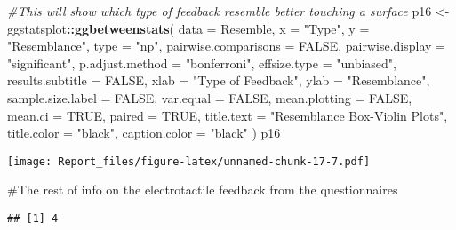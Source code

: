 \documentclass[
]{article}
\newenvironment{Shaded}{\begin{snugshade}}{\end{snugshade}}
\newcommand{\CommentTok}[1]{\textcolor[rgb]{0.56,0.35,0.01}{\textit{#1}}}
\newcommand{\DataTypeTok}[1]{\textcolor[rgb]{0.13,0.29,0.53}{#1}}
\newcommand{\KeywordTok}[1]{\textcolor[rgb]{0.13,0.29,0.53}{\textbf{#1}}}
\newcommand{\NormalTok}[1]{#1}
\newcommand{\OperatorTok}[1]{\textcolor[rgb]{0.81,0.36,0.00}{\textbf{#1}}}
\newcommand{\OtherTok}[1]{\textcolor[rgb]{0.56,0.35,0.01}{#1}}
\newcommand{\StringTok}[1]{\textcolor[rgb]{0.31,0.60,0.02}{#1}}
\begin{document}
\begin{Shaded}
\begin{Highlighting}[]
\CommentTok{#This will show which type of feedback resemble better touching a surface}
\NormalTok{p16 <-}\StringTok{ }\NormalTok{ggstatsplot}\OperatorTok{::}\KeywordTok{ggbetweenstats}\NormalTok{(}
  \DataTypeTok{data =}\NormalTok{ Resemble,}
  \DataTypeTok{x =} \StringTok{"Type"}\NormalTok{,}
  \DataTypeTok{y =} \StringTok{"Resemblance"}\NormalTok{,}
  \DataTypeTok{type =} \StringTok{"np"}\NormalTok{,}
  \DataTypeTok{pairwise.comparisons =} \OtherTok{FALSE}\NormalTok{,}
  \DataTypeTok{pairwise.display =} \StringTok{"significant"}\NormalTok{,}
  \DataTypeTok{p.adjust.method =} \StringTok{"bonferroni"}\NormalTok{,}
  \DataTypeTok{effsize.type =} \StringTok{"unbiased"}\NormalTok{,}
  \DataTypeTok{results.subtitle =} \OtherTok{FALSE}\NormalTok{,}
  \DataTypeTok{xlab =} \StringTok{"Type of Feedback"}\NormalTok{,}
  \DataTypeTok{ylab =} \StringTok{"Resemblance"}\NormalTok{,}
  \DataTypeTok{sample.size.label =} \OtherTok{FALSE}\NormalTok{,}
  \DataTypeTok{var.equal =} \OtherTok{FALSE}\NormalTok{,}
  \DataTypeTok{mean.plotting =} \OtherTok{FALSE}\NormalTok{,}
  \DataTypeTok{mean.ci =} \OtherTok{TRUE}\NormalTok{,}
  \DataTypeTok{paired =} \OtherTok{TRUE}\NormalTok{,}
  \DataTypeTok{title.text =} \StringTok{"Resemblance Box-Violin Plots"}\NormalTok{,}
  \DataTypeTok{title.color =} \StringTok{"black"}\NormalTok{,}
  \DataTypeTok{caption.color =} \StringTok{"black"}
\NormalTok{  )}
\NormalTok{p16}
\end{Highlighting}
\end{Shaded}

\texttt{[image: Report\_files/figure-latex/unnamed-chunk-17-7.pdf]}

\#The rest of info on the electrotactile feedback from the
questionnaires

\begin{Shaded}
\end{Shaded}

\begin{verbatim}
## [1] 4
\end{verbatim}

\begin{Shaded}
\end{Shaded}
\end{document}
